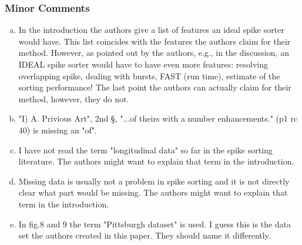 \subsubsection{Minor Comments}

\begin{enumerate}[a.]
	\item In the introduction the authors give a list of features an ideal spike sorter would have. This list coincides with the features the authors claim for their method. However, as pointed out by the authors, e.g., in the discussion, an IDEAL spike sorter would have to have even more features: resolving overlapping spike, dealing with bursts, FAST (run time), estimate of the sorting performance! The last point the authors can actually claim for their method, however, they do not.
	
	
		
	\item "I) A. Privious Art", 2nd §, "...of theirs with a number enhancements." (p1 rc 40) is missing an "of".
	
	
	\item I have not read the term "longitudinal data" so far in the spike sorting literature. The authors might want to explain that term in the introduction.
	
	
	\item Missing data is usually not a problem in spike sorting and it is not directly clear what part would be missing. The authors might want to explain that term in the introduction.
	
	
	\item  In fig.8 and 9 the term "Pittsburgh dataset" is used. I guess this is the data set the authors created in this paper. They should name it differently.
	
	

\end{enumerate}
